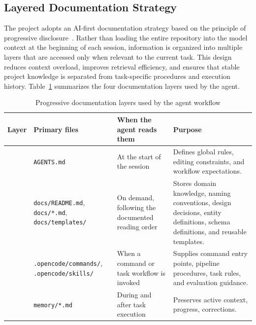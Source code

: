 \subsection{Layered Documentation Strategy}
The project adopts an AI-first documentation strategy based on the principle of progressive disclosure~\cite{viblo-ai-agent-convention}. Rather than loading the entire repository into the model context at the beginning of each session, information is organized into multiple layers that are accessed only when relevant to the current task. This design reduces context overload, improves retrieval efficiency, and ensures that stable project knowledge is separated from task-specific procedures and execution history. Table~\ref{tab:doc-layers} summarizes the four documentation layers used by the agent.



\begin{table}[htbp]
\centering
\footnotesize
\renewcommand{\arraystretch}{1.18}
\begin{tabularx}{\textwidth}{>{\raggedright\arraybackslash}p{0.8cm}
                            >{\raggedright\arraybackslash}p{4.7cm}
                            >{\raggedright\arraybackslash}p{3.7cm}
                            >{\raggedright\arraybackslash}X}
\toprule
\textbf{Layer} & \textbf{Primary files} & \textbf{When the agent reads them} & \textbf{Purpose} \\
\midrule
1 & \texttt{AGENTS.md} & At the start of the session & Defines global rules, editing constraints, and workflow expectations. \\
2 & \texttt{docs/README.md}, \texttt{docs/*.md}, \texttt{docs/templates/} & On demand, following the documented reading order & Stores domain knowledge, naming conventions, design decisions, entity definitions, schema definitions, and reusable templates. \\
3 & \texttt{.opencode/commands/}, \texttt{.opencode/skills/} & When a command or task workflow is invoked & Supplies command entry points, pipeline procedures, task rules, and evaluation guidance. \\
4 & \texttt{memory/*.md}  & During and after task execution & Preserves active context, progress, corrections. \\
\bottomrule
\end{tabularx}
\caption{Progressive documentation layers used by the agent workflow}
\label{tab:doc-layers}
\end{table}



